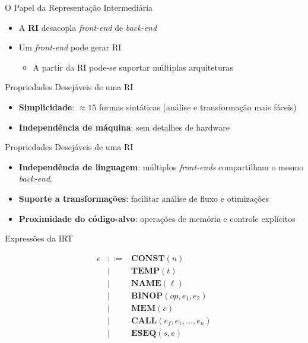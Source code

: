 \begin{frame}{O Papel da Representação Intermediária}

    \begin{itemize}

        \item
        A \textbf{RI} desacopla \emph{front-end} de \emph{back-end}
        \item
        Um \emph{front-end} pode gerar RI

        \begin{itemize}

            \item
            A partir da RI pode-se suportar múltiplas arquiteturas
        \end{itemize}
    \end{itemize}
\end{frame}

\begin{frame}{Propriedades Desejáveis de uma RI}

    \begin{itemize}

        \item
        \textbf{Simplicidade}: \(\approx 15\) formas sintáticas (análise e
        transformação mais fáceis)
        \item
        \textbf{Independência de máquina}: sem detalhes de hardware
    \end{itemize}
\end{frame}

\begin{frame}{Propriedades Desejáveis de uma RI}

    \begin{itemize}

        \item
        \textbf{Independência de linguagem}: múltiplos \emph{front-ends}
        compartilham o mesmo \emph{back-end}.
        \item
        \textbf{Suporte a transformações}: facilitar análise de fluxo e
        otimizações
        \item
        \textbf{Proximidade do código-alvo}: operações de memória e controle
        explícitos
    \end{itemize}
\end{frame}



\begin{frame}{Expressões da IRT}

    \[\begin{array}{lcll}
    e & ::= & \mathbf{CONST}(n)  \\
    & \mid & \mathbf{TEMP}(t)  \\
    & \mid & \mathbf{NAME}(\ell) \\
    & \mid & \mathbf{BINOP}(\mathit{op}, e_1, e_2) \\
    & \mid & \mathbf{MEM}(e) \\
    & \mid & \mathbf{CALL}(e_f, e_1, \ldots, e_n) \\
    & \mid & \mathbf{ESEQ}(s, e)
\end{array}\]
\end{frame}

